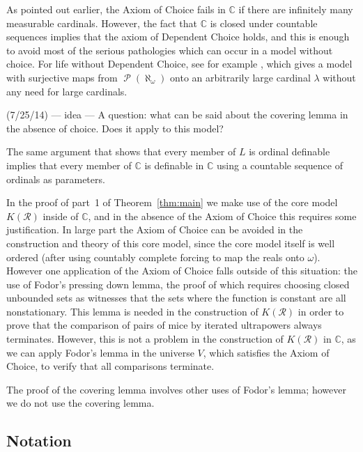 \documentclass[
twoside,
]{article}
\theoremstyle{definition}
\theoremstyle{remark}
\DeclareMathOperator{\ps}{\mathcal{P}}
\newcommand\reals{\mathcal{R}}
\newcommand\chang{\mathbb{C}}
\begin{document}
As pointed out earlier, the Axiom of Choice fails in $\chang$
if there are infinitely many measurable cardinals.    However, the
fact that $\chang$ is closed under countable sequences implies that
the axiom of Dependent Choice holds, and this is enough to avoid most of the serious 
pathologies which can occur in a model without choice.   
For life without Dependent Choice, see for example
\cite{Gitik2012Violating-the-s}, which gives a model with surjective
maps from $\ps(\aleph_{\omega})$ onto an arbitrarily large cardinal
$\lambda$ without any need for large cardinals.

\begin{todoenv} {(7/25/14) --- idea --- A question: what can be said
    about the covering lemma in the absence of choice.  Does it apply
    to this model?}
\end{todoenv}


The same argument that shows that every member of $L$ is ordinal definable implies that every member of
$\chang$ is definable in $\chang$ using a countable sequence of
ordinals as parameters.

In the proof of part~1 of Theorem~\ref{thm:main} we make use of 
the core model $K(\reals)$ inside of $\chang$, and in the absence of the Axiom
of Choice this requires some justification.   In large part the Axiom
of Choice can be avoided in the construction and theory of this core
model, since the core model itself is well ordered (after using countably complete forcing to map the reals onto $\omega$).   However one 
application of the Axiom of Choice falls outside of this situation:
the use of Fodor's pressing down lemma, the proof of which requires
choosing closed unbounded sets as witnesses that the sets where the
function is constant are all nonstationary.    This lemma is needed in
the construction of $K(\reals)$ in order to prove that  the comparison of pairs of mice by iterated ultrapowers  always terminates.     
However, this is not a problem 
in the construction of $K(\reals)$ in $\chang$, as we can apply Fodor's lemma in  the universe $V$, which satisfies the Axiom of Choice, to verify that all
comparisons terminate.

The proof of the covering lemma involves other uses of Fodor's lemma;
however we  do not use the covering lemma.

\subsection{Notation}
\label{sec:notation}
\end{document}
